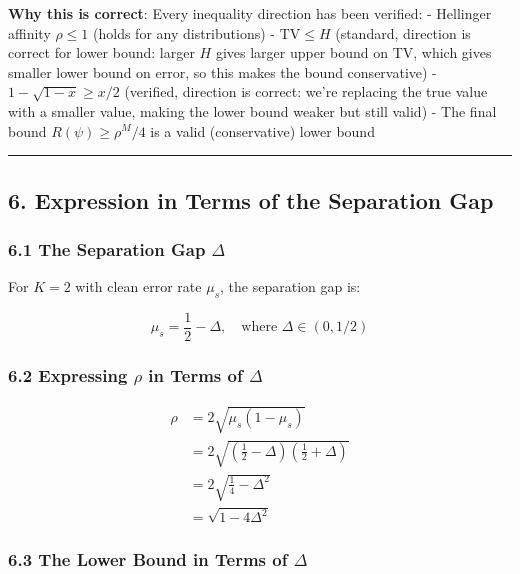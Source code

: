 \documentclass[
  12pt,
]{article}
\begin{document}
\textbf{Why this is correct}: Every inequality direction has been
verified: - Hellinger affinity \(\rho \leq 1\) (holds for any
distributions) - \(\text{TV} \leq H\) (standard, direction is correct
for lower bound: larger \(H\) gives larger upper bound on TV, which
gives smaller lower bound on error, so this makes the bound
conservative) - \(1 - \sqrt{1-x} \geq x/2\) (verified, direction is
correct: we're replacing the true value with a smaller value, making the
lower bound weaker but still valid) - The final bound
\(R(\psi) \geq \rho^M/4\) is a valid (conservative) lower bound

\begin{center}\rule{0.5\linewidth}{0.5pt}\end{center}

\subsection{6. Expression in Terms of the Separation
Gap}\label{expression-in-terms-of-the-separation-gap}

\subsubsection{\texorpdfstring{6.1 The Separation Gap
\(\Delta\)}{6.1 The Separation Gap \textbackslash Delta}}\label{the-separation-gap-delta}

For \(K=2\) with clean error rate \(\mu_s\), the separation gap is:

\[\mu_s = \frac12 - \Delta, \quad\text{where } \Delta \in (0, 1/2)\]

\subsubsection{\texorpdfstring{6.2 Expressing \(\rho\) in Terms of
\(\Delta\)}{6.2 Expressing \textbackslash rho in Terms of \textbackslash Delta}}\label{expressing-rho-in-terms-of-delta}

\[\begin{aligned}
\rho &= 2\sqrt{\mu_s(1-\mu_s)} \\
&= 2\sqrt{\left(\frac12 - \Delta\right)\left(\frac12 + \Delta\right)} \\
&= 2\sqrt{\frac14 - \Delta^2} \\
&= \sqrt{1 - 4\Delta^2}
\end{aligned}\]

\subsubsection{\texorpdfstring{6.3 The Lower Bound in Terms of
\(\Delta\)}{6.3 The Lower Bound in Terms of \textbackslash Delta}}\label{the-lower-bound-in-terms-of-delta}
\end{document}
